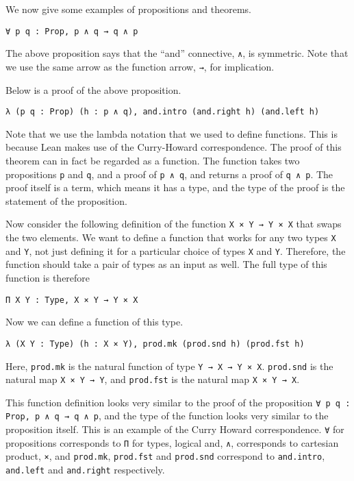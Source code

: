 \documentclass[12pt]{article} %
\theoremstyle{definition}
\theoremstyle{definition}
\theoremstyle{definition}
\theoremstyle{definition}
\begin{document}
We now give some examples of propositions and theorems.

\begin{lstlisting}
∀ p q : Prop, p ∧ q → q ∧ p
\end{lstlisting}

The above proposition says that the ``and'' connective, \lstinline{∧}, is symmetric. Note that
we use the same arrow as the function arrow, \lstinline{→}, for implication.

Below is a proof of the above proposition.
\begin{lstlisting}
λ (p q : Prop) (h : p ∧ q), and.intro (and.right h) (and.left h)
\end{lstlisting}

Note that we use the lambda notation that we used to define functions. This is because Lean
makes use of the Curry-Howard correspondence. The proof of this theorem can in fact be
regarded as a function. The function takes two propositions \lstinline{p} and \lstinline{q},
and a proof of \lstinline{p ∧ q}, and returns a proof of \lstinline{q ∧ p}. The proof itself
is a term, which means it has a type, and the type of the proof is the statement of the proposition.

Now consider the following definition of the function
\lstinline{X × Y → Y × X} that swaps the two elements. We want to define a function
that works for any two types \lstinline{X} and \lstinline{Y}, not just defining it for
a particular choice of types \lstinline{X} and \lstinline{Y}. Therefore, the
function should take a pair of types as an input as well. The full type of this function
is therefore

\begin{lstlisting}
Π X Y : Type, X × Y → Y × X
\end{lstlisting}

Now we can define a function of this type.

\begin{lstlisting}
λ (X Y : Type) (h : X × Y), prod.mk (prod.snd h) (prod.fst h)
\end{lstlisting}

Here, \lstinline{prod.mk} is the natural function of type \lstinline{Y → X → Y × X}.
\lstinline{prod.snd} is the natural map \lstinline{X × Y → Y}, and \lstinline{prod.fst}
is the natural map \lstinline{X × Y → X}.

This function definition looks very similar to the proof of the proposition
\lstinline{∀ p q : Prop, p ∧ q → q ∧ p}, and the type of the function
looks very similar to the proposition itself. This is an example of the Curry Howard
correspondence.
\lstinline{∀} for propositions corresponds to \lstinline{Π} for types,
logical and, \lstinline{∧}, corresponds to cartesian product, \lstinline{×}, and
\lstinline{prod.mk}, \lstinline{prod.fst} and \lstinline{prod.snd} correspond to
\lstinline{and.intro}, \lstinline{and.left} and \lstinline{and.right} respectively.
\end{document}
